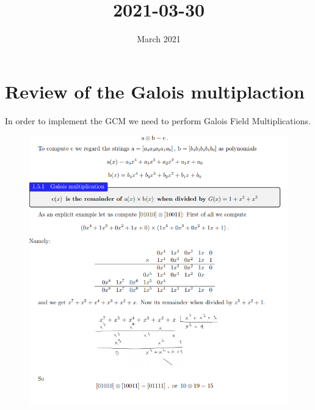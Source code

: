 \documentclass{article}
\title{2021-03-30}
\author{}
\date{March 2021}
\begin{document}
\maketitle

\section{Review of the Galois multiplaction}
In order to implement the GCM we need to perform Galois Field Multiplications.

\begin{figure}[H]
    \centering
    \includegraphics[scale=0.50]{1.png}
\end{figure}
\end{document}

